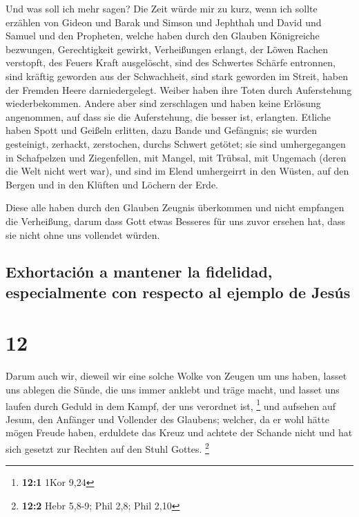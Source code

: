  Und was soll ich mehr sagen? Die Zeit würde mir zu kurz,
wenn ich sollte erzählen von Gideon und Barak und Simson und Jephthah
und David und Samuel und den Propheten,  welche haben
durch den Glauben Königreiche bezwungen, Gerechtigkeit gewirkt,
Verheißungen erlangt, der Löwen Rachen verstopft,  des
Feuers Kraft ausgelöscht, sind des Schwertes Schärfe entronnen, sind
kräftig geworden aus der Schwachheit, sind stark geworden im Streit,
haben der Fremden Heere darniedergelegt.  Weiber haben
ihre Toten durch Auferstehung wiederbekommen. Andere aber sind
zerschlagen und haben keine Erlösung angenommen, auf dass sie die
Auferstehung, die besser ist, erlangten.  Etliche haben
Spott und Geißeln erlitten, dazu Bande und Gefängnis; 
sie wurden gesteinigt, zerhackt, zerstochen, durchs Schwert getötet; sie
sind umhergegangen in Schafpelzen und Ziegenfellen, mit Mangel, mit
Trübsal, mit Ungemach  (deren die Welt nicht wert war),
und sind im Elend umhergeirrt in den Wüsten, auf den Bergen und in den
Klüften und Löchern der Erde.

 Diese alle haben durch den Glauben Zeugnis überkommen
und nicht empfangen die Verheißung,  darum dass Gott
etwas Besseres für uns zuvor ersehen hat, dass sie nicht ohne uns
vollendet würden.

\hypertarget{exhortaciuxf3n-a-mantener-la-fidelidad-especialmente-con-respecto-al-ejemplo-de-jesuxfas}{%
\subsection{Exhortación a mantener la fidelidad, especialmente con
respecto al ejemplo de
Jesús}\label{exhortaciuxf3n-a-mantener-la-fidelidad-especialmente-con-respecto-al-ejemplo-de-jesuxfas}}

\hypertarget{section-11}{%
\section{12}\label{section-11}}

 Darum auch wir, dieweil wir eine solche Wolke von Zeugen
um uns haben, lasset uns ablegen die Sünde, die uns immer anklebt und
träge macht, und lasset uns laufen durch Geduld in dem Kampf, der uns
verordnet ist, \footnote{\textbf{12:1} 1Kor 9,24}  und
aufsehen auf Jesum, den Anfänger und Vollender des Glaubens; welcher, da
er wohl hätte mögen Freude haben, erduldete das Kreuz und achtete der
Schande nicht und hat sich gesetzt zur Rechten auf den Stuhl Gottes.
\footnote{\textbf{12:2} Hebr 5,8-9; Phil 2,8; Phil 2,10}

